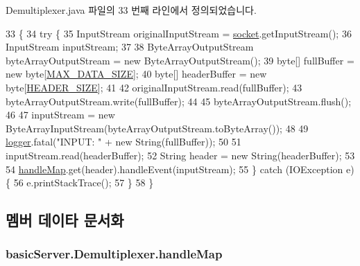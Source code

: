 Demultiplexer.\+java 파일의 33 번째 라인에서 정의되었습니다.


\begin{DoxyCode}
33                       \{
34         \textcolor{keywordflow}{try} \{
35             InputStream originalInputStream = \hyperlink{classbasic_server_1_1_demultiplexer_ae73d9106d863dd9c902a2a941619056b}{socket}.getInputStream();
36             InputStream inputStream;
37 
38             ByteArrayOutputStream byteArrayOutputStream = \textcolor{keyword}{new} ByteArrayOutputStream();
39             byte[] fullBuffer = \textcolor{keyword}{new} byte[\hyperlink{classbasic_server_1_1_demultiplexer_a22d173243d9c6e9b3715330181f2d891}{MAX\_DATA\_SIZE}];
40             byte[] headerBuffer = \textcolor{keyword}{new} byte[\hyperlink{classbasic_server_1_1_demultiplexer_a43686b9c044fc363ba7a9eae1f79120f}{HEADER\_SIZE}];
41             
42             originalInputStream.read(fullBuffer);
43             byteArrayOutputStream.write(fullBuffer);
44             
45             byteArrayOutputStream.flush();
46 
47             inputStream = \textcolor{keyword}{new} ByteArrayInputStream(byteArrayOutputStream.toByteArray()); 
48             
49             \hyperlink{classbasic_server_1_1_demultiplexer_afea28eb5eb1482f56ce6b661232767b1}{logger}.fatal(\textcolor{stringliteral}{"INPUT: "} + \textcolor{keyword}{new} String(fullBuffer));
50             
51             inputStream.read(headerBuffer);
52             String header = \textcolor{keyword}{new} String(headerBuffer);
53 
54             \hyperlink{classbasic_server_1_1_demultiplexer_a9faf12f00a74f61936cff837b03609bd}{handleMap}.get(header).handleEvent(inputStream);
55         \} \textcolor{keywordflow}{catch} (IOException e) \{
56             e.printStackTrace();
57         \}       
58     \}
\end{DoxyCode}


\subsection{멤버 데이타 문서화}
\hypertarget{classbasic_server_1_1_demultiplexer_a9faf12f00a74f61936cff837b03609bd}{
\subsubsection[{handle\+Map}]{ basic\+Server.\+Demultiplexer.\+handle\+Map\hspace{0.3cm}{\ttfamily [private]}}}\label{classbasic_server_1_1_demultiplexer_a9faf12f00a74f61936cff837b03609bd}


